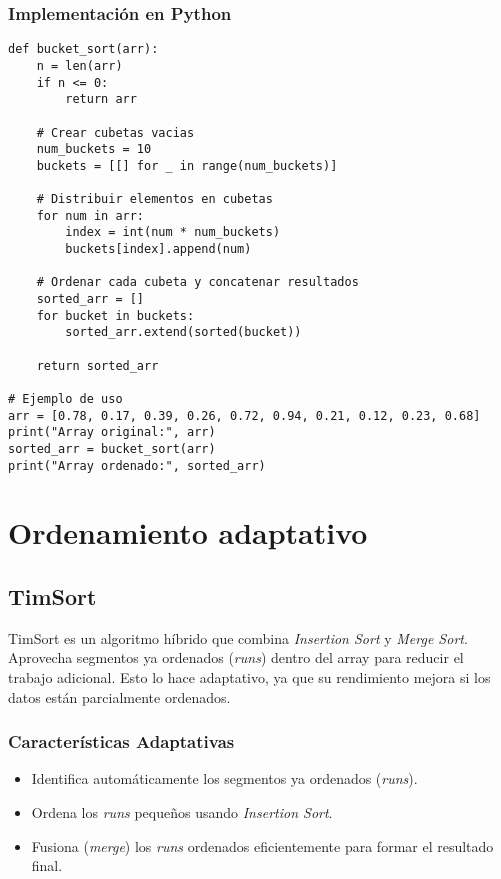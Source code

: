 \documentclass[11pt,openany]{book}
\begin{document}
\subsubsection{Implementación en Python}
\lstset{language=Python}
\begin{lstlisting}
def bucket_sort(arr):
    n = len(arr)
    if n <= 0:
        return arr

    # Crear cubetas vacias
    num_buckets = 10
    buckets = [[] for _ in range(num_buckets)]

    # Distribuir elementos en cubetas
    for num in arr:
        index = int(num * num_buckets)
        buckets[index].append(num)

    # Ordenar cada cubeta y concatenar resultados
    sorted_arr = []
    for bucket in buckets:
        sorted_arr.extend(sorted(bucket))

    return sorted_arr

# Ejemplo de uso
arr = [0.78, 0.17, 0.39, 0.26, 0.72, 0.94, 0.21, 0.12, 0.23, 0.68]
print("Array original:", arr)
sorted_arr = bucket_sort(arr)
print("Array ordenado:", sorted_arr)
\end{lstlisting}

\section{Ordenamiento adaptativo}
\subsection{TimSort}
TimSort es un algoritmo híbrido que combina \textit{Insertion Sort} y \textit{Merge Sort}. Aprovecha segmentos ya ordenados (\textit{runs}) dentro del array para reducir el trabajo adicional. Esto lo hace adaptativo, ya que su rendimiento mejora si los datos están parcialmente ordenados.

\subsubsection{Características Adaptativas}
\begin{itemize}
    \item Identifica automáticamente los segmentos ya ordenados (\textit{runs}).
    \item Ordena los \textit{runs} pequeños usando \textit{Insertion Sort}.
    \item Fusiona (\textit{merge}) los \textit{runs} ordenados eficientemente para formar el resultado final.
\end{itemize}
\end{document}
